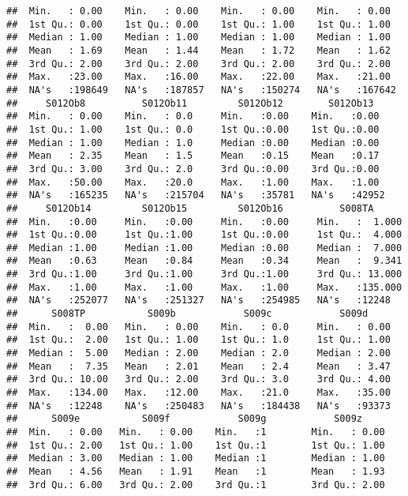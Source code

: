 \documentclass[
]{article}
\begin{document}
\begin{verbatim}
##  Min.   : 0.00    Min.   : 0.00    Min.   : 0.00    Min.   : 0.00   
##  1st Qu.: 0.00    1st Qu.: 0.00    1st Qu.: 1.00    1st Qu.: 1.00   
##  Median : 1.00    Median : 1.00    Median : 1.00    Median : 1.00   
##  Mean   : 1.69    Mean   : 1.44    Mean   : 1.72    Mean   : 1.62   
##  3rd Qu.: 2.00    3rd Qu.: 2.00    3rd Qu.: 2.00    3rd Qu.: 2.00   
##  Max.   :23.00    Max.   :16.00    Max.   :22.00    Max.   :21.00   
##  NA's   :198649   NA's   :187857   NA's   :150274   NA's   :167642  
##     S012Ob8          S012Ob11         S012Ob12        S012Ob13    
##  Min.   : 0.00    Min.   : 0.0     Min.   :0.00    Min.   :0.00   
##  1st Qu.: 1.00    1st Qu.: 0.0     1st Qu.:0.00    1st Qu.:0.00   
##  Median : 1.00    Median : 1.0     Median :0.00    Median :0.00   
##  Mean   : 2.35    Mean   : 1.5     Mean   :0.15    Mean   :0.17   
##  3rd Qu.: 3.00    3rd Qu.: 2.0     3rd Qu.:0.00    3rd Qu.:0.00   
##  Max.   :50.00    Max.   :20.0     Max.   :1.00    Max.   :1.00   
##  NA's   :165235   NA's   :215704   NA's   :35781   NA's   :42952  
##     S012Ob14         S012Ob15         S012Ob16          S008TA       
##  Min.   :0.00     Min.   :0.00     Min.   :0.00     Min.   :  1.000  
##  1st Qu.:0.00     1st Qu.:1.00     1st Qu.:0.00     1st Qu.:  4.000  
##  Median :1.00     Median :1.00     Median :0.00     Median :  7.000  
##  Mean   :0.63     Mean   :0.84     Mean   :0.34     Mean   :  9.341  
##  3rd Qu.:1.00     3rd Qu.:1.00     3rd Qu.:1.00     3rd Qu.: 13.000  
##  Max.   :1.00     Max.   :1.00     Max.   :1.00     Max.   :135.000  
##  NA's   :252077   NA's   :251327   NA's   :254985   NA's   :12248    
##      S008TP           S009b            S009c            S009d      
##  Min.   :  0.00   Min.   : 0.00    Min.   : 0.0     Min.   : 0.00  
##  1st Qu.:  2.00   1st Qu.: 1.00    1st Qu.: 1.0     1st Qu.: 1.00  
##  Median :  5.00   Median : 2.00    Median : 2.0     Median : 2.00  
##  Mean   :  7.35   Mean   : 2.01    Mean   : 2.4     Mean   : 3.47  
##  3rd Qu.: 10.00   3rd Qu.: 2.00    3rd Qu.: 3.0     3rd Qu.: 4.00  
##  Max.   :134.00   Max.   :12.00    Max.   :21.0     Max.   :35.00  
##  NA's   :12248    NA's   :250483   NA's   :184438   NA's   :93373  
##      S009e           S009f            S009g            S009z       
##  Min.   : 0.00   Min.   : 0.00    Min.   :1        Min.   : 0.00   
##  1st Qu.: 2.00   1st Qu.: 1.00    1st Qu.:1        1st Qu.: 1.00   
##  Median : 3.00   Median : 1.00    Median :1        Median : 1.00   
##  Mean   : 4.56   Mean   : 1.91    Mean   :1        Mean   : 1.93   
##  3rd Qu.: 6.00   3rd Qu.: 2.00    3rd Qu.:1        3rd Qu.: 2.00   

\end{verbatim}
\end{document}
